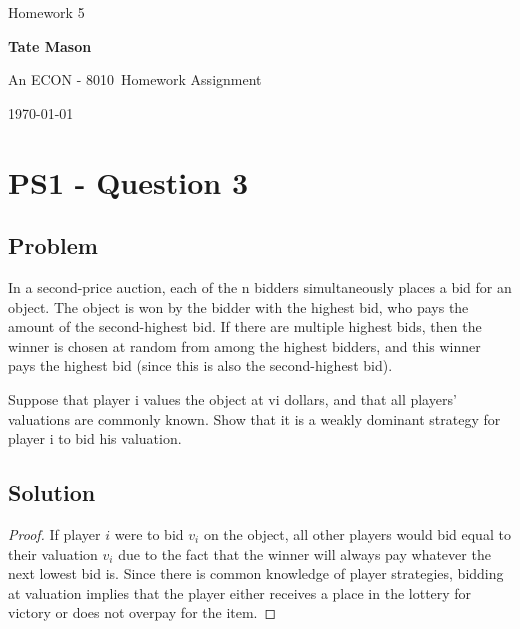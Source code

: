 \documentclass[10pt, a4paper]{article}
\newcommand\course{ECON - 8010}                            %
\newcommand\hwnumber{ 5}                                 %
\newcommand\Information{Tate Mason}                        %
\begin{document}
  \begin{titlepage}
    \begin{center}
      \vspace*{3cm}
            
        \vspace{1cm}
        \huge
        Homework \hwnumber
            
        \vspace{1.5cm}
        \Large
            
        \textbf{\Information}                      %
            
        \vfill
        
        An \course \ Homework Assignment
            
        \vspace{1cm}
        \Large

        
        \today
            
    \end{center}
  \end{titlepage}

  \newpage
\section*{PS1 - Question 3}
  \subsection*{Problem}
    In a second-price auction, each of the n bidders simultaneously places a bid for an
    object. The object is won by the bidder with the highest bid, who pays the amount of
    the second-highest bid. If there are multiple highest bids, then the winner is chosen at random from among the highest bidders, and this winner pays the highest bid (since this is also the second-highest bid).

    Suppose that player i values the object at vi dollars, and that all players’ valuations are commonly known. Show that it is a weakly dominant strategy for player i to bid his valuation.
  \subsection*{Solution}
    \begin{proof}
      If player $i$ were to bid $v_i$ on the object, all other players would bid equal to their valuation $v_i$ due to the fact that the winner will always pay whatever the next lowest bid is. Since there is common knowledge of player strategies, bidding at valuation implies that the player either receives a place in the lottery for victory or does not overpay for the item.  
    \end{proof}
\end{document}

